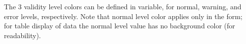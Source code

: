 The 3 validity level colors can be defined in  variable, for normal, warning, and error levels, respectively. Note that normal level color applies only in the form; for table display of data the normal level value has no background color (for readability).







